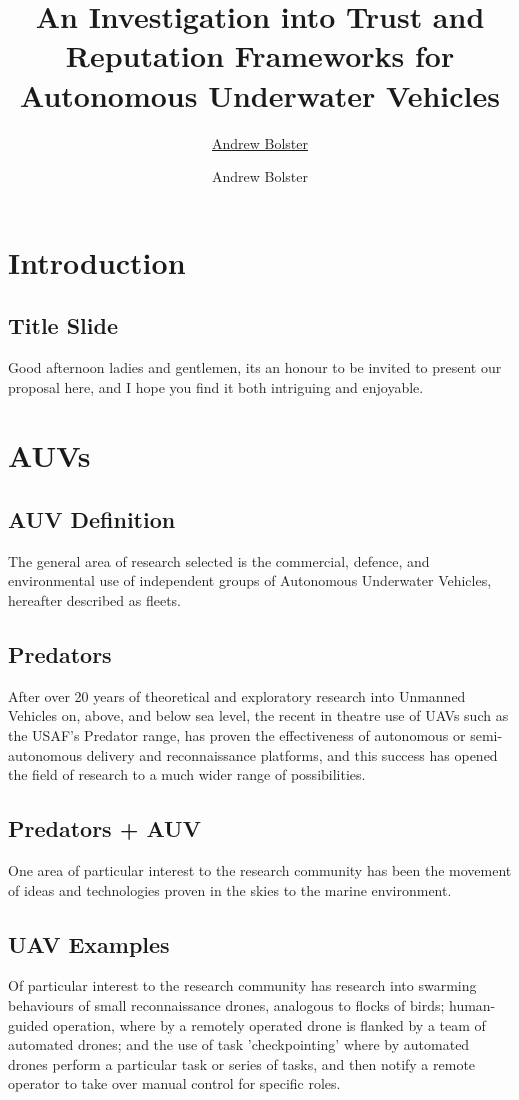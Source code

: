 \documentclass[oneside,9pt,a4paper]{Latex/Classes/PhDthesisPSnPDF}
\title{An Investigation into Trust and Reputation Frameworks for Autonomous Underwater Vehicles}
\author{\href{mailto:me@andrewbolster.info}{Andrew Bolster}}
\author{Andrew Bolster}
\begin{document}
\maketitle  %
\section{Introduction}
\subsection{Title Slide} 
Good afternoon ladies and gentlemen, its an honour to be
invited to present our proposal here, and I hope you find it both intriguing and
enjoyable.

\section{AUVs}
\subsection{AUV Definition}
The general area of research selected is the
commercial, defence, and environmental use of independent groups of Autonomous Underwater
Vehicles, hereafter described as fleets.

\subsection{Predators} After over 20 years of theoretical and exploratory
research into Unmanned Vehicles on, above, and below sea level, the recent  in theatre use of
UAVs such as the USAF's Predator range, has proven the effectiveness of
autonomous or semi-autonomous delivery and reconnaissance platforms, and this
success has opened the field of research to a much wider range of possibilities.

\subsection{Predators + AUV}  One area of particular interest to the research community
has been the movement of ideas and technologies proven in the skies to the
marine environment.

\subsection{UAV Examples}  Of particular interest to the research community has research
into swarming behaviours of small reconnaissance drones, analogous to flocks of
birds; human-guided operation, where by a remotely operated drone is flanked by
a team of automated drones; and the use of task 'checkpointing' where by
automated drones perform a particular task or series of tasks, and then notify a
remote operator to take over manual control for specific roles.
\end{document}
